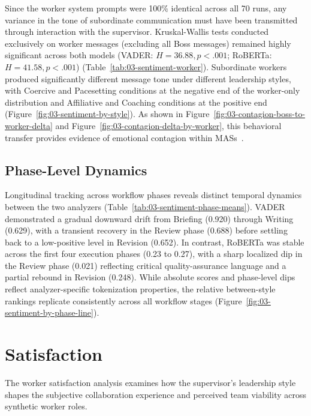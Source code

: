 Since the worker system prompts were 100\% identical across all 70 runs, any variance in the tone of subordinate communication must have been transmitted through interaction with the supervisor.
Kruskal-Wallis tests conducted exclusively on worker messages (excluding all Boss messages) remained highly significant across both models (\ac{VADER}: $H = 36.88, p < .001$; \ac{RoBERTa}: $H = 41.58, p < .001$) (Table~\ref{tab:03-sentiment-worker}).
Subordinate workers produced significantly different message tone under different leadership styles, with Coercive and Pacesetting conditions at the negative end of the worker-only distribution and Affiliative and Coaching conditions at the positive end (Figure~\ref{fig:03-sentiment-by-style}).
As shown in Figure~\ref{fig:03-contagion-boss-to-worker-delta} and Figure~\ref{fig:03-contagion-delta-by-worker}, this behavioral transfer provides evidence of emotional contagion within \acp{MAS}~\cite{lin2025simulatingsocialinfluencedynamics, zhang2024exploringcollaborationmechanismsllm}.

\subsection{Phase-Level Dynamics}
\label{subsec:phase-level-dynamics}

Longitudinal tracking across workflow phases reveals distinct temporal dynamics between the two analyzers (Table~\ref{tab:03-sentiment-phase-means}).
\ac{VADER} demonstrated a gradual downward drift from Briefing (0.920) through Writing (0.629), with a transient recovery in the Review phase (0.688) before settling back to a low-positive level in Revision (0.652).
In contrast, \ac{RoBERTa} was stable across the first four execution phases (0.23 to 0.27), with a sharp localized dip in the Review phase (0.021) reflecting critical quality-assurance language and a partial rebound in Revision (0.248).
While absolute scores and phase-level dips reflect analyzer-specific tokenization properties, the relative between-style rankings replicate consistently across all workflow stages (Figure~\ref{fig:03-sentiment-by-phase-line}).

\section{Satisfaction}
\label{sec:results-satisfaction}

The worker satisfaction analysis examines how the supervisor's leadership style shapes the subjective collaboration experience and perceived team viability across synthetic worker roles.


